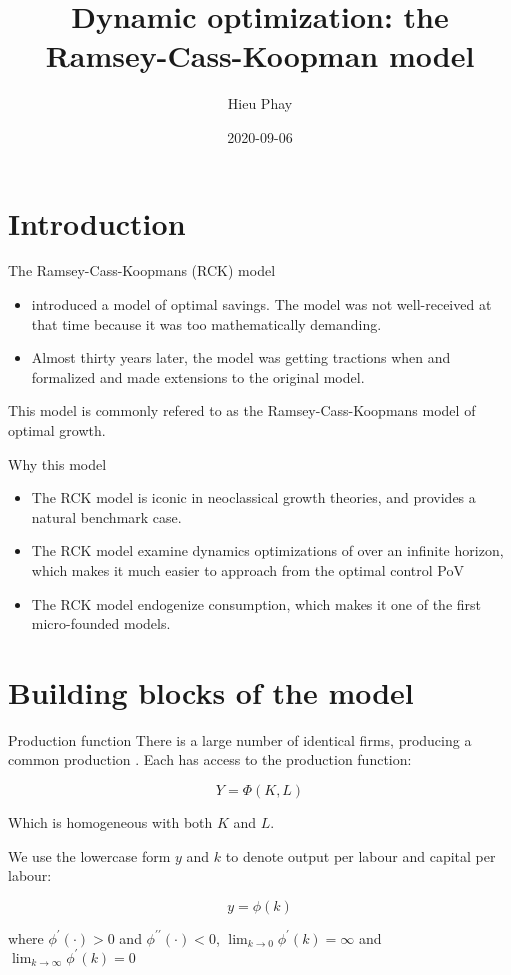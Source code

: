 \documentclass[10pt]{beamer}
\author{Hieu Phay}
\date{2020-09-06}
\title{Dynamic optimization: the Ramsey-Cass-Koopman model}
\begin{document}
\maketitle

\section{Introduction}
\label{sec:orgb9df8ae}
\begin{frame}[label={sec:org029717e}]{The Ramsey-Cass-Koopmans (RCK) model}
\begin{itemize}
\item \textcite{Ramsey1928} introduced a model of optimal savings. The model was not well-received at that time because it was too mathematically demanding.
\item Almost thirty years later, the model was getting tractions when \textcite{RePEc:cwl:cwldpp:163} and \textcite{Cass1965} formalized and made extensions to the original model.
\end{itemize}

This model is commonly refered to as the \alert{Ramsey-Cass-Koopmans model of optimal growth}.
\end{frame}

\begin{frame}[label={sec:org019dfb9}]{Why this model}
\begin{itemize}
\item The RCK model is iconic in neoclassical growth theories, and provides a natural benchmark case.
\item The RCK model examine dynamics optimizations of over an infinite horizon, which makes it much easier to approach from the optimal control PoV
\item The RCK model endogenize consumption, which makes it one of the first micro-founded models.
\end{itemize}
\end{frame}

\section{Building blocks of the model}
\label{sec:orgcaa1a4a}
\begin{frame}[label={sec:org3a13c68}]{Production function}
There is a large number of identical firms, producing a common production . Each has access to the production function:

$$
Y = \Phi(K, L)
$$

Which is \alert{homogeneous} with both \(K\) and \(L\).

We use the lowercase form \(y\) and \(k\) to denote output per labour and capital per labour:

$$
y = \phi(k)
$$

where \(\phi^{\prime}(\cdot) > 0\) and \(\phi^{\prime\prime}(\cdot) < 0\), \(\lim_{k \to 0} \phi^{'}(k) = \infty\) and \(\lim_{k \to \infty} \phi^{'}(k) = 0\)
\end{frame}
\end{document}
